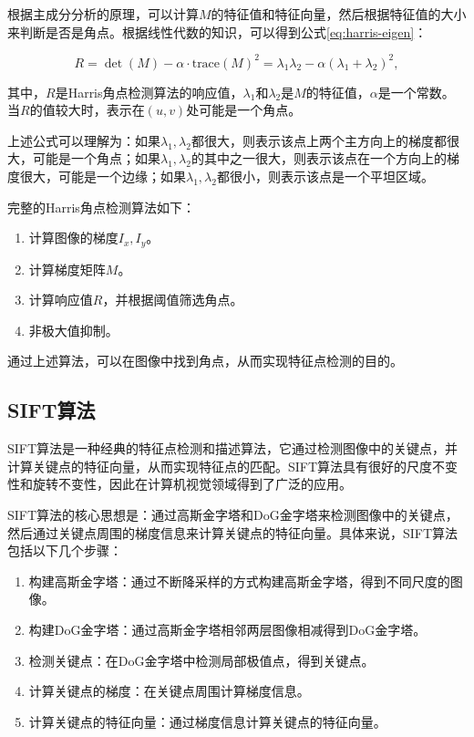 根据主成分分析的原理，可以计算$M$的特征值和特征向量，然后根据特征值的大小来判断是否是角点。根据线性代数的知识，可以得到公式\ref{eq:harris-eigen}：

\begin{equation}
    R = \det(M) - \alpha \cdot \text{trace}(M)^2 = \lambda_1 \lambda_2 - \alpha (\lambda_1 + \lambda_2)^2,
\end{equation}

其中，$R$是Harris角点检测算法的响应值，$\lambda_1$和$\lambda_2$是$M$的特征值，$\alpha$是一个常数。当$R$的值较大时，表示在$(u, v)$处可能是一个角点。

上述公式可以理解为：如果$\lambda_1,\lambda_2$都很大，则表示该点上两个主方向上的梯度都很大，可能是一个角点；如果$\lambda_1,\lambda_2$的其中之一很大，则表示该点在一个方向上的梯度很大，可能是一个边缘；如果$\lambda_1,\lambda_2$都很小，则表示该点是一个平坦区域。

完整的Harris角点检测算法如下：

\begin{enumerate}
    \item 计算图像的梯度$I_x, I_y$。
    \item 计算梯度矩阵$M$。
    \item 计算响应值$R$，并根据阈值筛选角点。
    \item 非极大值抑制。
\end{enumerate}

通过上述算法，可以在图像中找到角点，从而实现特征点检测的目的。

\subsection{SIFT算法}

SIFT算法是一种经典的特征点检测和描述算法，它通过检测图像中的关键点，并计算关键点的特征向量，从而实现特征点的匹配。SIFT算法具有很好的尺度不变性和旋转不变性，因此在计算机视觉领域得到了广泛的应用。

SIFT算法的核心思想是：通过高斯金字塔和DoG金字塔来检测图像中的关键点，然后通过关键点周围的梯度信息来计算关键点的特征向量。具体来说，SIFT算法包括以下几个步骤：

\begin{enumerate}
    \item 构建高斯金字塔：通过不断降采样的方式构建高斯金字塔，得到不同尺度的图像。
    \item 构建DoG金字塔：通过高斯金字塔相邻两层图像相减得到DoG金字塔。
    \item 检测关键点：在DoG金字塔中检测局部极值点，得到关键点。
    \item 计算关键点的梯度：在关键点周围计算梯度信息。
    \item 计算关键点的特征向量：通过梯度信息计算关键点的特征向量。
\end{enumerate}

